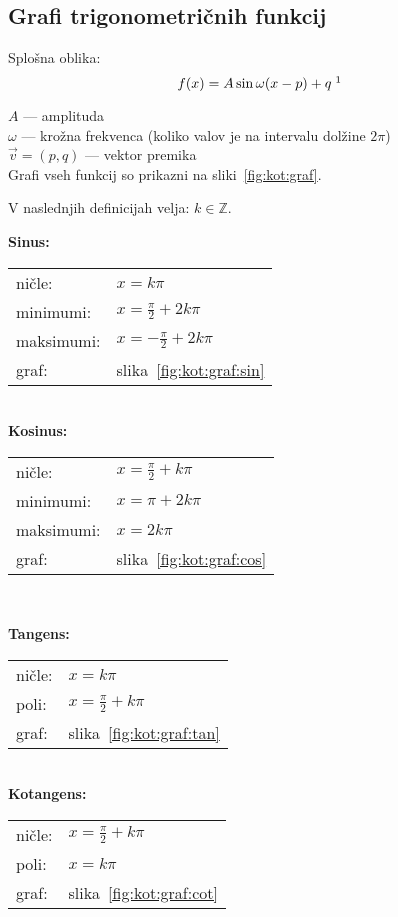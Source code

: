 \documentclass[a4paper,oneside,12pt,fleqn]{article}
\def\Z{\ensuremath{\mathbb Z}}
\numberwithin{equation}{section}
\begin{document}
\subsection{Grafi trigonometričnih funkcij}
\label{sec:kot:graf}
Splošna oblika:
\[ f(x) = A\sin\omega(x-p)+q \; \footnotemark \]

$A$ --- amplituda \\
$\omega$ --- krožna frekvenca (koliko valov je na intervalu dolžine $2\pi$) \\
$\vec{v} = (p,q)$ --- vektor premika \\
Grafi vseh funkcij so prikazni na sliki~\ref{fig:kot:graf}.

V naslednjih definicijah velja: $k \in \Z$.

\parbox[t]{0.5\textwidth}{
\textbf{Sinus:} \\[6pt]
\begin{tabular}[h!]{ll}
  ničle:    & $x = k\pi$ \\
  minimumi: & $x = \frac{\pi}{2} + 2k\pi$ \\
  maksimumi:& $x = -\frac{\pi}{2} + 2k\pi$ \\  
  graf:     & slika~\ref{fig:kot:graf:sin}
\end{tabular} \\[12pt]
\textbf{Kosinus:}\\[6pt]
\begin{tabular}[h!]{ll}
  ničle:    & $x = \frac{\pi}{2} + k\pi$ \\
  minimumi: & $x = \pi + 2k\pi$ \\
  maksimumi:& $x = 2k\pi$ \\ 
  graf:     & slika~\ref{fig:kot:graf:cos}
\end{tabular} \\[12pt]
}
\parbox[t]{0.5\textwidth}{
\textbf{Tangens:} \\[6pt]
\begin{tabular}[h!]{ll}
  ničle: & $x = k\pi$ \\
  poli:  & $x = \frac{\pi}{2} + k\pi$ \\
  graf:     & slika~\ref{fig:kot:graf:tan}
\end{tabular} \\[24pt]
\textbf{Kotangens:} \\[6pt]
\begin{tabular}[h!]{ll}
  ničle:  & $x = \frac{\pi}{2} + k\pi$ \\
  poli: & $x = k\pi$ \\
  graf:     & slika~\ref{fig:kot:graf:cot}
\end{tabular} \\[12pt]
}
\end{document}
